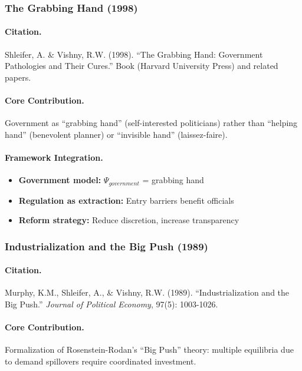 \subsubsection{The Grabbing Hand (1998)}

\paragraph{Citation.}
Shleifer, A. \& Vishny, R.W. (1998).
``The Grabbing Hand: Government Pathologies and Their Cures.''
Book (Harvard University Press) and related papers.

\paragraph{Core Contribution.}
Government as ``grabbing hand'' (self-interested politicians) rather than
``helping hand'' (benevolent planner) or ``invisible hand'' (laissez-faire).

\paragraph{Framework Integration.}
\begin{itemize}
  \item \textbf{Government model:} $\Psi_{government}$ = grabbing hand
  \item \textbf{Regulation as extraction:} Entry barriers benefit officials
  \item \textbf{Reform strategy:} Reduce discretion, increase transparency
\end{itemize}

\subsubsection{Industrialization and the Big Push (1989)}

\paragraph{Citation.}
Murphy, K.M., Shleifer, A., \& Vishny, R.W. (1989).
``Industrialization and the Big Push.''
\emph{Journal of Political Economy}, 97(5): 1003-1026.

\paragraph{Core Contribution.}
Formalization of Rosenstein-Rodan's ``Big Push'' theory: multiple equilibria
due to demand spillovers require coordinated investment.

